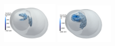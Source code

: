\begin{frame}[fragile]
\begin{figure}
    \includegraphics[width=0.24\textwidth]{png/g_il_minusx.png}
    \includegraphics[width=0.25\textwidth]{png/g_it_minusx.png}
  \end{figure}

\end{frame}
